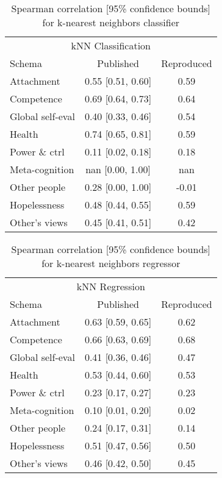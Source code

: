 \documentclass[11pt,a4paper]{article}
\begin{document}
\begin{table}[H]
\centering
\begin{tabular}{lcc}
\toprule
\multicolumn{3}{c}{\large kNN Classification} \\
Schema                  &Published          &Reproduced \\ %
\midrule
Attachment              & 0.55 [0.51, 0.60] & 0.59 \\
Competence              & 0.69 [0.64, 0.73] & 0.64 \\
Global self-eval        & 0.40 [0.33, 0.46] & 0.54 \\
Health                  & 0.74 [0.65, 0.81] & 0.59 \\
Power \& ctrl           & 0.11 [0.02, 0.18] & 0.18 \\
Meta-cognition          & nan [0.00, 1.00] & nan \\
Other people            & 0.28 [0.00, 1.00] & -0.01 \\
Hopelessness            & 0.48 [0.44, 0.55] & 0.59 \\
Other's views           & 0.45 [0.41, 0.51] & 0.42 \\
\bottomrule
\end{tabular}
\caption{Spearman correlation [95\% confidence bounds] for k-nearest neighbors classifier}
\label{tab:knn_classification}
\end{table}

\begin{table}[H]
\centering
\begin{tabular}{lcc}
\toprule
\multicolumn{3}{c}{\large kNN Regression} \\
Schema                  &Published          &Reproduced \\ %
\midrule
Attachment              & 0.63 [0.59, 0.65] & 0.62 \\
Competence              & 0.66 [0.63, 0.69] & 0.68 \\
Global self-eval        & 0.41 [0.36, 0.46] & 0.47 \\
Health                  & 0.53 [0.44, 0.60] & 0.53 \\
Power \& ctrl           & 0.23 [0.17, 0.27] & 0.23 \\
Meta-cognition          & 0.10 [0.01, 0.20] & 0.02 \\
Other people            & 0.24 [0.17, 0.31] & 0.14 \\
Hopelessness            & 0.51 [0.47, 0.56] & 0.50 \\
Other's views           & 0.46 [0.42, 0.50] & 0.45 \\
\bottomrule
\end{tabular}
\caption{Spearman correlation [95\% confidence bounds] for k-nearest neighbors regressor}
\label{tab:knn_regression}
\end{table}
\end{document}
